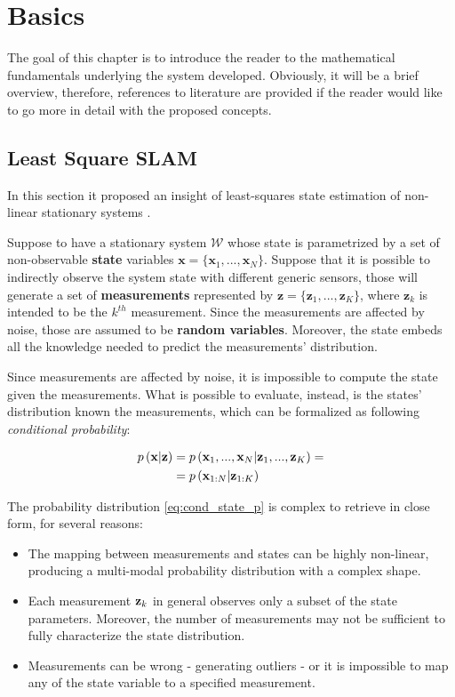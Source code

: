 \chapter{Basics}\label{ch:basics}
The goal of this chapter is to introduce the reader to the mathematical fundamentals underlying the system developed. Obviously, it will be a brief overview, therefore, references to literature are provided if the reader would like to go more in detail with the proposed concepts.

\section{Least Square SLAM}
In this section it proposed an insight of least-squares state estimation of non-linear stationary systems \cite{charnes1976least-squares}.

Suppose to have a stationary system $\mathcal{W}$ whose state is parametrized by a set of non-observable \textbf{state} variables $\mathbf{x} = \{\mathbf{x}_1, ..., \mathbf{x}_N\}$. Suppose that it is possible to indirectly observe the system state with different generic sensors, those will generate a set of \textbf{measurements} represented by $\mathbf{z} = \{\mathbf{z}_1, ..., \mathbf{z}_K\}$, where $\mathbf{z}_k$ is intended to be the $k^{th}$ measurement. Since the measurements are affected by noise, those are assumed to be \textbf{random variables}. Moreover, the state embeds all the knowledge needed to predict the measurements' distribution.

Since measurements are affected by noise, it is impossible to compute the state given the measurements. What is possible to evaluate, instead, is the states' distribution known the measurements, which can be formalized as following \textit{conditional probability}:

\begin{align} 
    p\left(\mathbf{x} | \mathbf{z}\right) &= p\left(\mathbf{x}_1, ..., \mathbf{x}_N | \mathbf{z}_1, ..., \mathbf{z}_K\right) = \nonumber \\
    &= p\left(\mathbf{x}_{1:N} | \mathbf{z}_{1:K}\right)
    \label{eq:cond_state_p}
\end{align}

The probability distribution \ref{eq:cond_state_p} is complex to retrieve in close form, for several reasons: 
\begin{itemize}
    \item The mapping between measurements and states can be highly non-linear, producing a multi-modal probability distribution with a complex shape.
    \item Each measurement $\mathbf{z}_k$ in general observes only a subset of the state parameters. Moreover, the number of measurements may not be sufficient to fully characterize the state distribution.
    \item Measurements can be wrong - generating outliers - or it is impossible to map any of the state variable to a specified measurement.
\end{itemize}

